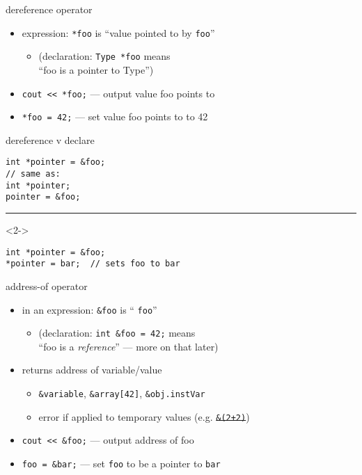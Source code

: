 \begin{frame}[fragile,label=dereference]{dereference operator}
    \begin{itemize}
        \item expression: \verb|*foo| is ``value pointed to by \verb|foo|''
        \begin{itemize}
            \item (declaration: \verb|Type *foo| means\\``foo is a pointer to Type'')
        \end{itemize}
        \vspace{.5cm}
        \item \lstinline|cout << *foo;| --- output value foo points to
        \item \lstinline|*foo = 42;| --- set value foo points to to 42
    \end{itemize}
\end{frame}

\begin{frame}[fragile,label=derefAndDecl]{dereference v declare}
\lstset{language=C++,style=small}
\begin{lstlisting}
int *pointer = &foo;
// same as:
int *pointer;
pointer = &foo;
\end{lstlisting}
\hrule
\begin{visibleenv}<2->
\begin{lstlisting}
int *pointer = &foo;
*pointer = bar;  // sets foo to bar
\end{lstlisting}
\end{visibleenv}
\end{frame}

\begin{frame}[fragile,label=addressOf]{address-of operator}
    \begin{itemize}
        \item in an expression: \verb|&foo| is `` \verb|foo|''
        \begin{itemize}
            \item (declaration: \verb|int &foo = 42;| means \\
                ``foo is a \textit{reference}'' --- more on that later)
        \end{itemize}
        \vspace{.5cm}
        \item returns address of variable/value
            \begin{itemize}
            \item {\tt \&variable}, {\tt \&array[42]}, {\tt \&obj.instVar}
            \item error if applied to temporary values (e.g. \sout{\tt \&(2+2)})
            \end{itemize}
        \vspace{.5cm}
        \item \lstinline|cout << &foo;| --- output address of foo
        \item \lstinline|foo = &bar;| --- set {\tt foo} to be a pointer to {\tt bar}
    \end{itemize}
\end{frame}

